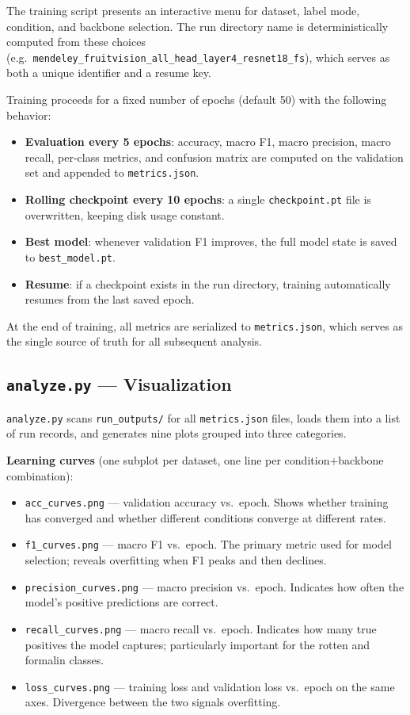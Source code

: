 \documentclass[12pt, a4paper]{article}
\begin{document}
The training script presents an interactive menu for dataset, label mode,
condition, and backbone selection.
The run directory name is deterministically computed from these choices
(e.g.\ \texttt{mendeley\_fruitvision\_all\_head\_layer4\_resnet18\_fs}),
which serves as both a unique identifier and a resume key.

Training proceeds for a fixed number of epochs (default 50) with the following
behavior:
\begin{itemize}
    \item \textbf{Evaluation every 5 epochs}: accuracy, macro F1, macro
    precision, macro recall, per-class metrics, and confusion matrix are
    computed on the validation set and appended to \texttt{metrics.json}.
    \item \textbf{Rolling checkpoint every 10 epochs}: a single
    \texttt{checkpoint.pt} file is overwritten, keeping disk usage constant.
    \item \textbf{Best model}: whenever validation F1 improves, the full model
    state is saved to \texttt{best\_model.pt}.
    \item \textbf{Resume}: if a checkpoint exists in the run directory,
    training automatically resumes from the last saved epoch.
\end{itemize}
At the end of training, all metrics are serialized to
\texttt{metrics.json}, which serves as the single source of truth for all
subsequent analysis.

\subsection{\texttt{analyze.py} --- Visualization}

\texttt{analyze.py} scans \texttt{run\_outputs/} for all
\texttt{metrics.json} files, loads them into a list of run records, and
generates nine plots grouped into three categories.

\textbf{Learning curves} (one subplot per dataset, one line per
condition+backbone combination):
\begin{itemize}
    \item \texttt{acc\_curves.png} --- validation accuracy vs.\ epoch.
    Shows whether training has converged and whether different conditions
    converge at different rates.
    \item \texttt{f1\_curves.png} --- macro F1 vs.\ epoch.
    The primary metric used for model selection; reveals overfitting when
    F1 peaks and then declines.
    \item \texttt{precision\_curves.png} --- macro precision vs.\ epoch.
    Indicates how often the model's positive predictions are correct.
    \item \texttt{recall\_curves.png} --- macro recall vs.\ epoch.
    Indicates how many true positives the model captures; particularly
    important for the rotten and formalin classes.
    \item \texttt{loss\_curves.png} --- training loss and validation loss
    vs.\ epoch on the same axes.
    Divergence between the two signals overfitting.
\end{itemize}
\end{document}
